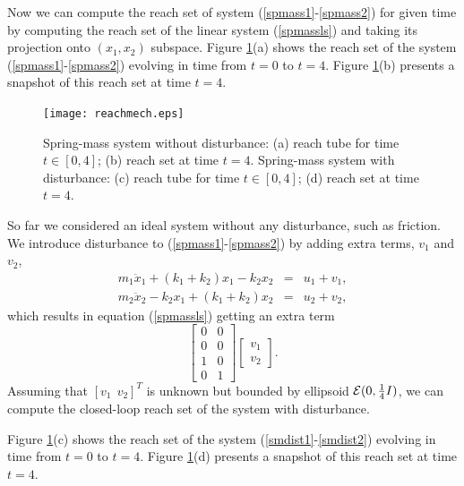 Now we can compute the reach set of system (\ref{spmass1}-\ref{spmass2})
for given time by computing the reach set of the linear system (\ref{spmassls})
and taking its projection onto $(x_1, x_2)$ subspace.
\newpage
{}
Figure \ref{mechreachfig}(a) shows the reach set of the system
(\ref{spmass1}-\ref{spmass2}) evolving in time from $t=0$ to $t=4$.
Figure \ref{mechreachfig}(b) presents a snapshot of this reach set at time
$t=4$.
\begin{figure}%
\centerline{
\texttt{[image: reachmech.eps]}}
\caption{Spring-mass system without disturbance:
(a) reach tube for time $t\in[0,4]$; (b) reach set at time $t=4$.
Spring-mass system with disturbance:
(c) reach tube for time $t\in[0,4]$; (d) reach set at time $t=4$.}
\label{mechreachfig}
\end{figure}

So far we considered an ideal system without any disturbance, such as friction.
We introduce disturbance to (\ref{spmass1}-\ref{spmass2}) by adding extra
terms, $v_1$ and $v_2$,
\begin{eqnarray}
m_1\ddot{x}_1+(k_1+k_2)x_1-k_2x_2 & = & u_1 + v_1, \label{smdist1}\\
m_2\ddot{x}_2-k_2x_1+(k_1+k_2)x_2 & = & u_2 + v_2, \label{smdist2}
\end{eqnarray}
which results in equation (\ref{spmassls}) getting an extra term
\[ \left[\begin{array}{cc}
0 & 0\\
0 & 0\\
1 & 0\\
0 & 1\end{array}\right]\left[\begin{array}{c}
v_1\\
v_2\end{array}\right]. \]
Assuming that $[v_1 ~~ v_2]^T$ is unknown but bounded by ellipsoid
$\EE(0, \frac{1}{4}I)$, we can compute the closed-loop reach set of the system
with disturbance.

Figure \ref{mechreachfig}(c) shows the reach set of the system
(\ref{smdist1}-\ref{smdist2}) evolving in time from $t=0$ to $t=4$.
Figure \ref{mechreachfig}(d) presents a snapshot of this reach set at time
$t=4$.



